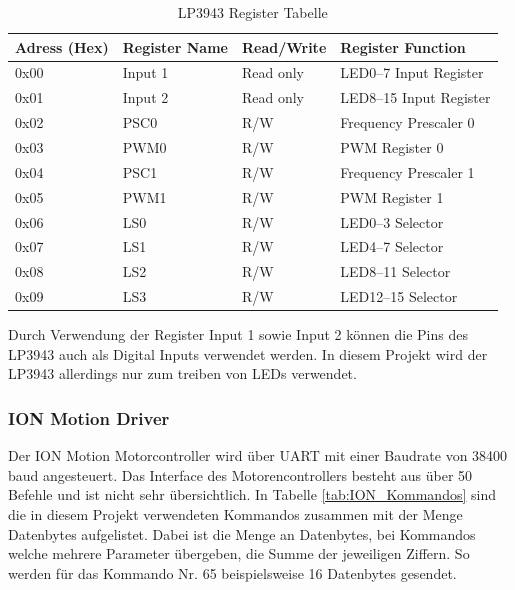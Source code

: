 \begin{table}[H]
	\centering
	\caption{LP3943 Register Tabelle \protect\cite{LP3943}}
	\begin{tabular}{|l|l|l|l|}
		\hline
		\textbf{Adress (Hex)} & \textbf{Register Name} & \textbf{Read/Write} & \textbf{Register Function} \\
		\hline
		0x00  & Input 1 & Read only & LED0–7 Input Register \\
		\hline
		0x01  & Input 2 & Read only & LED8–15 Input Register \\
		\hline
		0x02  & PSC0  & R/W   & Frequency Prescaler 0 \\
		\hline
		0x03  & PWM0  & R/W   & PWM Register 0 \\
		\hline
		0x04  & PSC1  & R/W   & Frequency Prescaler 1 \\
		\hline
		0x05  & PWM1  & R/W   & PWM Register 1 \\
		\hline
		0x06  & LS0   & R/W   & LED0–3 Selector \\
		\hline
		0x07  & LS1   & R/W   & LED4–7 Selector \\
		\hline
		0x08  & LS2   & R/W   & LED8–11 Selector \\
		\hline
		0x09  & LS3   & R/W   & LED12–15 Selector \\
		\hline
	\end{tabular}%
	\label{tab:LP3943_Register}%
\end{table}%

Durch Verwendung der Register Input 1 sowie Input 2 können die Pins des LP3943 auch als Digital Inputs verwendet werden. In diesem Projekt wird der LP3943 allerdings nur zum treiben von LEDs verwendet.

\subsubsection{ION Motion Driver}
Der ION Motion Motorcontroller wird über UART mit einer Baudrate von 38400 baud angesteuert. Das Interface des Motorencontrollers besteht aus über 50 Befehle und ist nicht sehr übersichtlich. In Tabelle \ref{tab:ION_Kommandos} sind die in diesem Projekt verwendeten Kommandos zusammen mit der Menge Datenbytes aufgelistet. Dabei ist die Menge an Datenbytes, bei Kommandos welche mehrere Parameter übergeben, die Summe der jeweiligen Ziffern. So werden für das Kommando Nr. 65 beispielsweise 16 Datenbytes gesendet.

